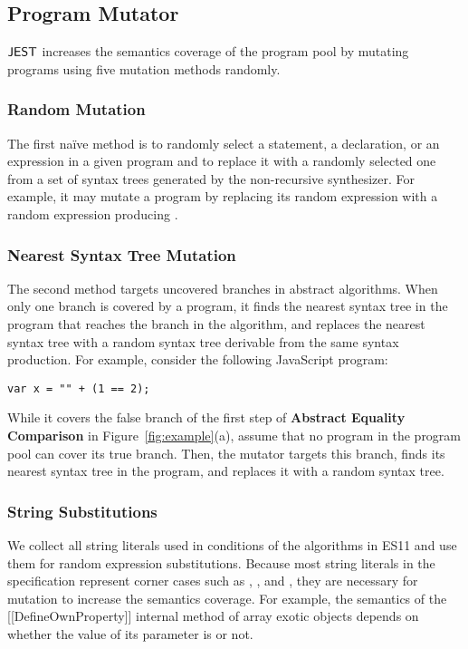 \subsection{Program Mutator}
$\tool$ increases the semantics coverage of the program pool by mutating programs
using five mutation methods randomly.

\subsubsection{Random Mutation}
The first na\"ive method is to randomly select a statement, a
declaration, or an expression in a given program and to replace it
with a randomly selected one from a set of syntax trees generated by
the non-recursive synthesizer.
For example, it may mutate a program  by replacing
its random expression  with a random expression  producing
.


\subsubsection{Nearest Syntax Tree Mutation}
The second method targets uncovered branches in abstract algorithms.
When only one branch is covered by a program, it finds the nearest
syntax tree in the program that reaches the branch in the algorithm, and
replaces the nearest syntax tree with a random syntax tree derivable
from the same syntax production.  For example, consider the following JavaScript program:
\begin{lstlisting}[style=myJSstyle]
                var x = "" + (1 == 2);
\end{lstlisting}
While it covers the false branch of the first step of
\textbf{Abstract Equality Comparison} in Figure~\ref{fig:example}(a),
assume that no program in the program pool can cover its true branch.
Then, the mutator targets this branch, finds its nearest syntax tree
 in the program, and replaces it with a random syntax tree.


\subsubsection{String Substitutions}
We collect all string literals used in conditions of the algorithms in ES11
and use them for random expression substitutions.
Because most string literals in the specification represent corner cases
such as , , and , they are necessary for mutation
to increase the semantics coverage.  For example, the semantics of the
[[DefineOwnProperty]] internal method of array exotic objects depends
on whether the value of its parameter  is  or not.


